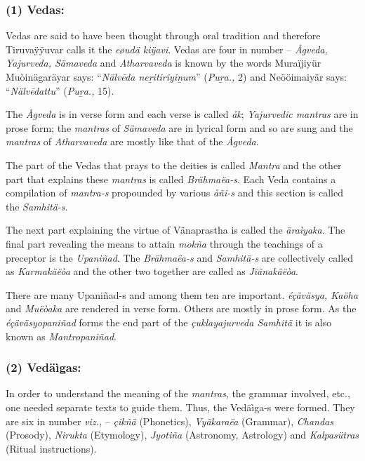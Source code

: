 \subsubsection*{(1) Vedas:}

Vedas are said to have been thought through oral tradition and therefore Tiruvaÿÿuvar calls it the \textit{eøudä kiÿavi}. Vedas are four in number – \textit{Ågveda, Yajurveda, Sämaveda} and \textit{Atharvaveda} is known by the words Muraïjiyür Muòinägaräyar says: “\textit{Nälvēda neṟitiriyiṉum}” (\textit{Puṟa.,} 2) and Neööimaiyär says: “\textit{Nälvēdattu}” (\textit{Puṟa.,} 15).

The \textit{Ågveda} is in verse form and each verse is called \textit{åk}; \textit{Yajurvedic mantras} are in prose form; the \textit{mantras} of \textit{Sämaveda} are in lyrical form and so are sung and the \textit{mantras} of \textit{Atharvaveda} are mostly like that of the \textit{Ågveda}.

The part of the Vedas that prays to the deities is called \textit{Mantra} and the other part that explains these \textit{mantras} is called \textit{Brähmaëa-s}. Each Veda contains a compilation of \textit{mantra-s} propounded by various \textit{åñi-s} and this section is called the \textit{Samhitä-s}.

The next part explaining the virtue of Vänaprastha is called the \textit{äraìyaka}. The final part revealing the means to attain \textit{mokña} through the teachings of a preceptor is the \textit{Upaniñad}. The \textit{Brähmaëa-s} and \textit{Samhitä-s} are collectively called as \textit{Karmakäëòa} and the other two together are called as \textit{Jïänakäëòa}.

There are many Upaniñad-s and among them ten are important. \textit{éçäväsya, Kaöha} and \textit{Muëòaka} are rendered in verse form. Others are mostly in prose form. As the \textit{éçäväsyopaniñad} forms the end part of the \textit{çuklayajurveda Samhitä} it is also known as \textit{Mantropaniñad}.


\subsubsection*{(2) Vedäìgas:}

In order to understand the meaning of the \textit{mantras}, the grammar involved, etc., one needed separate texts to guide them. Thus, the Vedäìga-s were formed. They are six in number \textit{viz.,} – \textit{çikñä} (Phonetics), \textit{Vyäkaraëa} (Grammar), \textit{Chandas} (Prosody), \textit{Nirukta} (Etymology), \textit{Jyotiña} (Astronomy, Astrology) and \textit{Kalpasütras} (Ritual instructions).

